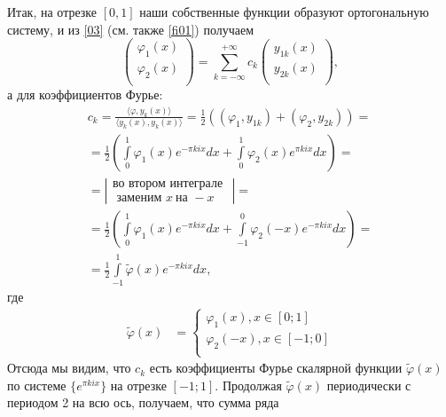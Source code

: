 Итак, на отрезке $[0,1]$ наши собственные функции образуют
ортогональную систему, и из \eqref{03} (см. также \eqref{fi01})
получаем
$$\begin{pmatrix}
   \varphi_1(x) \\
    \varphi_2(x) \\
\end{pmatrix}= \sum\limits_{k=-\infty}^{+\infty}c_{k} \begin{pmatrix}
   y_{1k}(x) \\
    y_{2k}(x) \\
\end{pmatrix},  $$
а для коэффициентов Фурье:
\begin{multline*}
	c_k=
	\frac{\langle \varphi, y_{k}(x)\rangle}{\langle y_{k}(x), y_{k}(x)\rangle}
	= \frac12\left(\left(\varphi_1,y_{1k}\right) +
	\left(\varphi_2,y_{2k}\right)\right)=
	\\=
	\frac12\left( \int\limits_{0}^{1} {\varphi_1}(x)e^{-\pi
	k i x}dx+ \int\limits_{0}^{1} {\varphi_2}(x)e^{ \pi
	k i x}dx\right) =
	\\=
	\left| \begin{array}{c}
	\text{во втором интеграле }\\ \text{  заменим } x \ \text{на }-x
	\end{array}\right|=
	\\=
	\frac12\left( \int\limits_{0}^{1} {\varphi_1}(x)e^{-\pi
	k i x}dx + \int\limits_{-1}^{0} {\varphi_2}(-x)e^{ -\pi
	k i x}dx\right) =
	\\=
	\frac12\int\limits_{-1}^{1} {\widetilde{\varphi} }(x)e^{-\pi
	k i x}dx,
\end{multline*}
где
 \begin{equation}\label{phi}
    \begin{matrix}
    \tilde{\varphi}(x) & =
    \left\{
    \begin{matrix}
    \varphi_{1}(x), x\in [0;1]\\
    \varphi_{2}(-x), x\in [-1;0]\\
    \end{matrix} \right.
    \end{matrix}
\end{equation}
Отсюда мы видим, что $c_k$ есть коэффициенты Фурье скалярной функции
$\widetilde{\varphi}(x)$  по системе
 {$\{e^{\pi kix}\}$} на отрезке
$[-1;1]$. Продолжая $\widetilde{\varphi}(x)$ периодически с периодом
2 на всю ось, получаем, что сумма ряда
